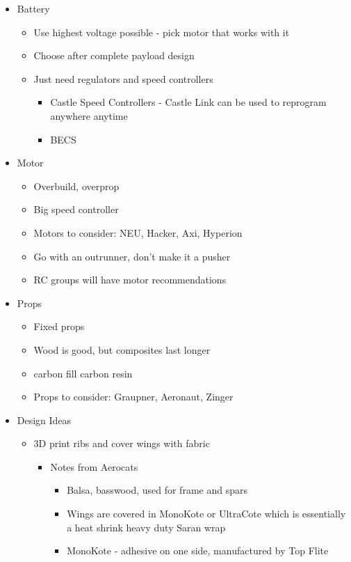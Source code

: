 \documentclass{article}
\begin{document}
\begin{spacing}{1.1}
\begin{itemize}
\begin{itemize}
	\end{itemize}
	\item Battery
	\begin{itemize}
		\item Use highest voltage possible - pick motor that works with it
		\item Choose after complete payload design
		\item Just need regulators and speed controllers
		\begin{itemize}
			\item Castle Speed Controllers - Castle Link can be used to reprogram anywhere anytime
			\item BECS
		\end{itemize}
	\end{itemize}
	\item Motor
	\begin{itemize}
		\item Overbuild, overprop
		\item Big speed controller
		\item Motors to consider: NEU, Hacker, Axi, Hyperion
		\item Go with an outrunner, don't make it a pusher
		\item RC groups will have motor recommendations
	\end{itemize}
	\item Props
	\begin{itemize}
		\item Fixed props
		\item Wood is good, but composites last longer
		\item carbon fill carbon resin
		\item Props to consider: Graupner, Aeronaut, Zinger
	\end{itemize}
	\item Design Ideas
	\begin{itemize}
		\item 3D print ribs and cover wings with fabric
		\begin{itemize}
			\item Notes from Aerocats
			\begin{itemize}
				\item Balsa, basswood, used for frame and spars
				\item Wings are covered in MonoKote or UltraCote which is essentially a heat shrink heavy duty Saran wrap
				\item MonoKote - adhesive on one side, manufactured by Top Flite

\end{itemize}
\end{itemize}
\end{itemize}
\end{itemize}
\end{spacing}
\end{document}

